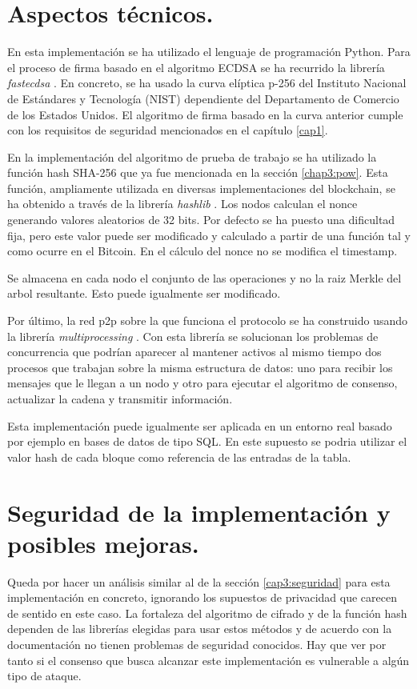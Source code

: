 \section{Aspectos técnicos.}
En esta implementación se ha utilizado el lenguaje de programación Python. Para el proceso de firma basado en el algoritmo ECDSA se ha recurrido la librería \textit{fastecdsa} \citep{fastecdsa}. En concreto, se ha usado la curva elíptica p-256 del Instituto Nacional de Estándares y Tecnología (NIST) dependiente del Departamento de Comercio de los Estados Unidos. El algoritmo de firma basado en la curva anterior cumple con los requisitos de seguridad mencionados en el capítulo \ref{cap1}.

En la implementación del algoritmo de prueba de trabajo se ha utilizado la función hash SHA-256 que ya fue mencionada en la sección \ref{chap3:pow}. Esta función, ampliamente utilizada en diversas implementaciones del blockchain, se ha obtenido a través de la librería \textit{hashlib} \citep{hashlib}. Los nodos calculan el nonce generando valores aleatorios de 32 bits. Por defecto se ha puesto una dificultad fija, pero este valor puede ser modificado y calculado a partir de una función tal y como ocurre en el Bitcoin. En el cálculo del nonce no se modifica el timestamp.


Se almacena en cada nodo el conjunto de las operaciones y no la raiz Merkle del arbol resultante. Esto puede igualmente ser modificado.

Por último, la red p2p sobre la que funciona el protocolo se ha construido usando la librería \textit{multiprocessing} \citep{multiprocessing}. Con esta librería se solucionan los problemas de concurrencia que podrían aparecer al mantener activos al mismo tiempo dos procesos que trabajan sobre la misma estructura de datos: uno para recibir los mensajes que le llegan a un nodo y otro para ejecutar el algoritmo de consenso, actualizar la cadena y transmitir información.


Esta implementación puede igualmente ser aplicada en un entorno real basado por ejemplo en bases de datos de tipo SQL. En este supuesto se podria utilizar el valor hash de cada bloque como referencia de las entradas de la tabla.


\section{Seguridad de la implementación y posibles mejoras.}
Queda por hacer un análisis similar al de la sección \ref{cap3:seguridad} para esta implementación en concreto, ignorando los supuestos de privacidad que carecen de sentido en este caso. La fortaleza del algoritmo de cifrado y de la función hash dependen de las librerías elegidas para usar estos métodos y de acuerdo con la documentación no tienen problemas de seguridad conocidos.
Hay que ver por tanto si el consenso que busca alcanzar este implementación es vulnerable a algún tipo de ataque. 


